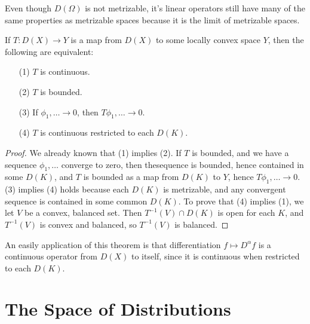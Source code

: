 Even though $D(\Omega)$ is not metrizable, it's linear operators still have many of the same properties as metrizable spaces because it is the limit of metrizable spaces.

\begin{theorem}
    If $T: D(X) \to Y$ is a map from $D(X)$ to some locally convex space $Y$, then the following are equivalent:
    \begin{itemize}
        \item[(1)] $T$ is continuous.
        \item[(2)] $T$ is bounded.
        \item[(3)] If $\phi_1, \dots \to 0$, then $T\phi_1, \dots \to 0$.
        \item[(4)] $T$ is continuous restricted to each $D(K)$.
    \end{itemize}
\end{theorem}
\begin{proof}
    We already known that (1) implies (2). If $T$ is bounded, and we have a sequence $\phi_1, \dots$ converge to zero, then thesequence is bounded, hence contained in some $D(K)$, and $T$ is bounded as a map from $D(K)$ to $Y$, hence $T\phi_1, \dots \to 0$. (3) implies (4) holds because each $D(K)$ is metrizable, and any convergent sequence is contained in some common $D(K)$. To prove that (4) implies (1), we let $V$ be a convex, balanced set. Then $T^{-1}(V) \cap D(K)$ is open for each $K$, and $T^{-1}(V)$ is convex and balanced, so $T^{-1}(V)$ is balanced.
\end{proof}

An easily application of this theorem is that differentiation $f \mapsto D^\alpha f$ is a continuous operator from $D(X)$ to itself, since it is continuous when restricted to each $D(K)$.

\section{The Space of Distributions}

